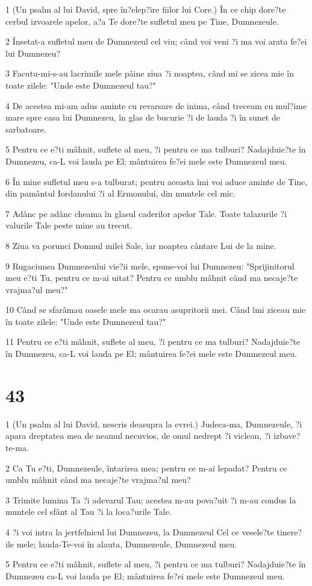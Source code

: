 \par 1 (Un psalm al lui David, spre în?elep?ire fiilor lui Core.) În ce chip dore?te cerbul izvoarele apelor, a?a Te dore?te sufletul meu pe Tine, Dumnezeule.
\par 2 Însetat-a sufletul meu de Dumnezeul cel viu; când voi veni ?i ma voi arata fe?ei lui Dumnezeu?
\par 3 Facutu-mi-s-au lacrimile mele pâine ziua ?i noaptea, când mi se zicea mie în toate zilele: "Unde este Dumnezeul tau?"
\par 4 De acestea mi-am adus aminte cu revarsare de inima, când treceam cu mul?ime mare spre casa lui Dumnezeu, în glas de bucurie ?i de lauda ?i în sunet de sarbatoare.
\par 5 Pentru ce e?ti mâhnit, suflete al meu, ?i pentru ce ma tulburi? Nadajduie?te în Dumnezeu, ca-L voi lauda pe El; mântuirea fe?ei mele este Dumnezeul meu.
\par 6 În mine sufletul meu s-a tulburat; pentru aceasta îmi voi aduce aminte de Tine, din pamântul Iordanului ?i al Ermonului, din muntele cel mic.
\par 7 Adânc pe adânc cheama în glasul caderilor apelor Tale. Toate talazurile ?i valurile Tale peste mine au trecut.
\par 8 Ziua va porunci Domnul milei Sale, iar noaptea cântare Lui de la mine.
\par 9 Rugaciunea Dumnezeului vie?ii mele, spune-voi lui Dumnezeu: "Sprijinitorul meu e?ti Tu, pentru ce m-ai uitat? Pentru ce umblu mâhnit când ma necaje?te vrajma?ul meu?"
\par 10 Când se sfarâmau oasele mele ma ocarau asupritorii mei. Când îmi ziceau mie în toate zilele: "Unde este Dumnezeul tau?"
\par 11 Pentru ce e?ti mâhnit, suflete al meu, ?i pentru ce ma tulburi? Nadajduie?te în Dumnezeu, ca-L voi lauda pe El; mântuirea fe?ei mele este Dumnezeul meu.

\chapter{43}

\par 1 (Un psalm al lui David, nescris deasupra la evrei.) Judeca-ma, Dumnezeule, ?i apara dreptatea mea de neamul necuvios, de omul nedrept ?i viclean, ?i izbave?te-ma.
\par 2 Ca Tu e?ti, Dumnezeule, întarirea mea; pentru ce m-ai lepadat? Pentru ce umblu mâhnit când ma necaje?te vrajma?ul meu?
\par 3 Trimite lumina Ta ?i adevarul Tau; acestea m-au pova?uit ?i m-au condus la muntele cel sfânt al Tau ?i la loca?urile Tale.
\par 4 ?i voi intra la jertfelnicul lui Dumnezeu, la Dumnezeul Cel ce vesele?te tinere?ile mele; lauda-Te-voi în alauta, Dumnezeule, Dumnezeul meu.
\par 5 Pentru ce e?ti mâhnit, suflete al meu, ?i pentru ce ma tulburi? Nadajduie?te în Dumnezeu ca-L voi lauda pe El; mântuirea fe?ei mele este Dumnezeul meu.

